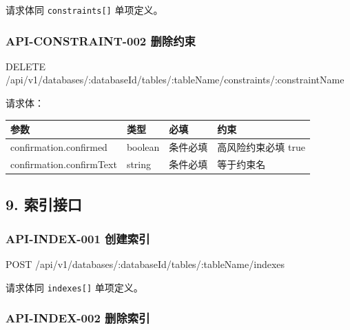 \documentclass[
  a4paper,
  UTF8]{ctexart}
\newenvironment{Shaded}{}{}
\newcommand{\NormalTok}[1]{#1}
\begin{document}
请求体同 \texttt{constraints{[}{]}} 单项定义。

\hypertarget{api-constraint-002-ux5220ux9664ux7ea6ux675f}{%
\subsubsection{API-CONSTRAINT-002
删除约束}\label{api-constraint-002-ux5220ux9664ux7ea6ux675f}}

\begin{Shaded}
\begin{Highlighting}[]
\NormalTok{DELETE /api/v1/databases/:databaseId/tables/:tableName/constraints/:constraintName}
\end{Highlighting}
\end{Shaded}

请求体：

\begin{longtable}[]{@{}llll@{}}
\toprule
参数 & 类型 & 必填 & 约束 \\
\midrule
\endhead
confirmation.confirmed & boolean & 条件必填 & 高风险约束必填 true \\
confirmation.confirmText & string & 条件必填 & 等于约束名 \\
\bottomrule
\end{longtable}

\hypertarget{ux7d22ux5f15ux63a5ux53e3}{%
\subsection{9. 索引接口}\label{ux7d22ux5f15ux63a5ux53e3}}

\hypertarget{api-index-001-ux521bux5efaux7d22ux5f15}{%
\subsubsection{API-INDEX-001
创建索引}\label{api-index-001-ux521bux5efaux7d22ux5f15}}

\begin{Shaded}
\begin{Highlighting}[]
\NormalTok{POST /api/v1/databases/:databaseId/tables/:tableName/indexes}
\end{Highlighting}
\end{Shaded}

请求体同 \texttt{indexes{[}{]}} 单项定义。

\hypertarget{api-index-002-ux5220ux9664ux7d22ux5f15}{%
\subsubsection{API-INDEX-002
删除索引}\label{api-index-002-ux5220ux9664ux7d22ux5f15}}
\end{document}
